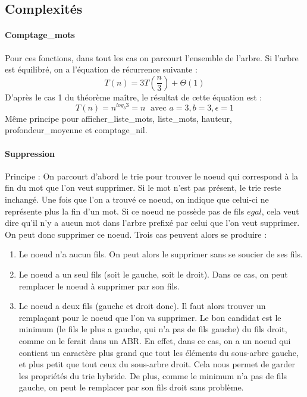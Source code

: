 \documentclass[11pt]{report} %
\begin{document}
\subsection{Complexités}
\paragraph{\textbf{Comptage\_mots}}
Pour ces fonctions, dans tout les cas on parcourt l'ensemble de l'arbre. Si l'arbre est équilibré, on a l'équation de récurrence suivante :
\[
T(n)=3T\left(\frac{n}{3}\right)+\Theta(1)
\] 
D'après le cas 1 du théorème maître, le résultat de cette équation est : 
\[
T(n)=n^{log_{3}3}=n \; \text{ avec } a=3, b=3, \epsilon=1
\]
Même principe pour afficher\_liste\_mots, liste\_mots, hauteur, profondeur\_moyenne et comptage\_nil.

\paragraph{\textbf{Suppression}}
Principe : On parcourt d'abord le trie pour trouver le noeud qui correspond à la fin du mot que l'on veut supprimer.
Si le mot n'est pas présent, le trie reste inchangé. Une fois que l'on a trouvé ce noeud, on indique que celui-ci ne représente plus la fin d'un mot. Si ce noeud ne possède pas de fils $egal$, cela veut dire qu'il n'y a aucun mot dans l'arbre prefixé par celui que l'on veut supprimer. On peut donc supprimer ce noeud. Trois cas peuvent alors se produire : \\
\begin{enumerate}
\item Le noeud n'a aucun fils. On peut alors le supprimer sans se soucier de ses fils. 
\item Le noeud a un seul fils (soit le gauche, soit le droit). Dans ce cas, on peut remplacer le noeud à supprimer par son fils.
\item Le noeud a deux fils (gauche et droit donc). Il faut alors trouver un remplaçant pour le noeud que l'on va supprimer. Le bon candidat est le minimum (le fils le plus a gauche, qui n'a pas de fils gauche) du fils droit, comme on le ferait dans un ABR. En effet, dans ce cas, on a un noeud qui contient un caractère plus grand que tout les éléments du sous-arbre gauche, et plus petit que tout ceux du sous-arbre droit. Cela nous permet de garder les propriétés du trie hybride. De plus, comme le minimum n'a pas de fils gauche, on peut le remplacer par son fils droit sans problème.
\end{enumerate}
\end{document}
